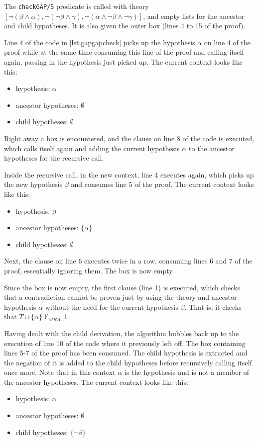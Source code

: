 \documentclass[11pt,twoside,a4paper]{report}
\begin{document}
The \lstinline$checkGAP/5$ predicate is called with theory $[\neg(\beta\wedge\alpha), \neg(\neg\beta\wedge\gamma), \neg(\alpha\wedge\neg\beta\wedge\neg\gamma)]$, and empty lists for the ancestor and child hypotheses. It is also given the outer box (lines 4 to 15 of the proof). 

Line 4 of the code in \autoref{lst:gapgapcheck} picks up the hypothesis $\alpha$ on line 4 of the proof while at the same time consuming this line of the proof and calling itself again, passing in the hypothesis just picked up. The current context looks like this:
\begin{itemize}
\item
hypothesis: $\alpha$
\item
ancestor hypotheses: $\emptyset$
\item
child hypotheses: $\emptyset$
\end{itemize}

Right away a box is encountered, and the clause on line 8 of the code is executed, which calls itself again and adding the current hypothesis $\alpha$ to the ancestor hypotheses for the recursive call.

Inside the recursive call, in the new context, line 4 executes again, which picks up the new hypothesis $\beta$ and consumes line 5 of the proof. The current context looks like this:
\begin{itemize}
\item
hypothesis: $\beta$
\item
ancestor hypotheses: $\{\alpha\}$
\item
child hypotheses: $\emptyset$
\end{itemize}

Next, the clause on line 6 executes twice in a row, consuming lines 6 and 7 of the proof, essentially ignoring them. The box is now empty.

Since the box is now empty, the first clause (line 1) is executed, which checks that a contradiction cannot be proven just by using the theory and ancestor hypothesis $\alpha$ without the need for the current hypothesis $\beta$. That is, it checks that $T\cup\{\alpha\}\nvdash_{MRA}\bot$.

Having dealt with the child derivation, the algorithm bubbles back up to the execution of line 10 of the code where it previously left off. The box containing lines 5-7 of the proof has been consumed. The child hypothesis is extracted and the negation of it is added to the child hypotheses before recursively calling itself once more. Note that in this context $\alpha$ is the hypothesis and is not a member of the ancestor hypotheses. The current context looks like this:
\begin{itemize}
\item
hypothesis: $\alpha$
\item
ancestor hypotheses: $\emptyset$
\item
child hypotheses: $\{\neg\beta\}$
\end{itemize}
\end{document}
